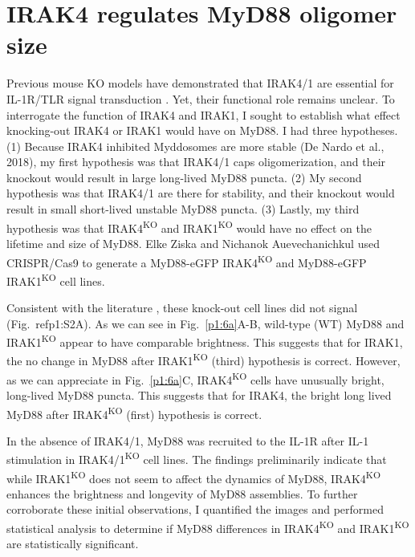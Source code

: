 \section{IRAK4 regulates MyD88 oligomer size}
Previous mouse KO models have demonstrated that IRAK4/1 are essential for IL-1R/TLR signal transduction \autocite{Thomas_2003}\autocite{Wang_2009}\autocite{Jain_2020}. Yet, their functional role remains unclear. To interrogate the function of IRAK4 and IRAK1, I sought to establish what effect knocking-out IRAK4 or IRAK1 would have on MyD88. I had three hypotheses. (1) Because IRAK4 inhibited Myddosomes are more stable (De Nardo et al., 2018), my first hypothesis was that IRAK4/1 caps oligomerization, and their knockout would result in large long-lived MyD88 puncta. (2) My second hypothesis was that IRAK4/1 are there for stability, and their knockout would result in small short-lived unstable MyD88 puncta. (3) Lastly, my third hypothesis was that IRAK4\textsuperscript{KO} and IRAK1\textsuperscript{KO} would have no effect on the lifetime and size of MyD88. Elke Ziska and Nichanok Auevechanichkul used CRISPR/Cas9 to generate a MyD88-eGFP IRAK4\textsuperscript{KO} and MyD88-eGFP IRAK1\textsuperscript{KO} cell lines. 

Consistent with the literature \autocite{DeFelice_2019}\autocite{Suzuki_2002}, these knock-out cell lines did not signal (Fig.~ref{p1:S2}A). As we can see in Fig.~\ref{p1:6a}A-B, wild-type (WT) MyD88 and IRAK1\textsuperscript{KO} appear to have comparable brightness. This suggests that for IRAK1, the no change in MyD88 after IRAK1\textsuperscript{KO} (third) hypothesis is correct. However, as we can appreciate in Fig.~\ref{p1:6a}C, IRAK4\textsuperscript{KO} cells have unusually bright, long-lived MyD88 puncta. This suggests that for IRAK4, the bright long lived MyD88 after IRAK4\textsuperscript{KO} (first) hypothesis is correct.

In the absence of IRAK4/1, MyD88 was recruited to the IL-1R after IL-1 stimulation in IRAK4/1\textsuperscript{KO} cell lines. The findings preliminarily indicate that while IRAK1\textsuperscript{KO} does not seem to affect the dynamics of MyD88, IRAK4\textsuperscript{KO} enhances the brightness and longevity of MyD88 assemblies. To further corroborate these initial observations, I quantified the images and performed statistical analysis to determine if MyD88 differences in IRAK4\textsuperscript{KO} and IRAK1\textsuperscript{KO} are statistically significant.


